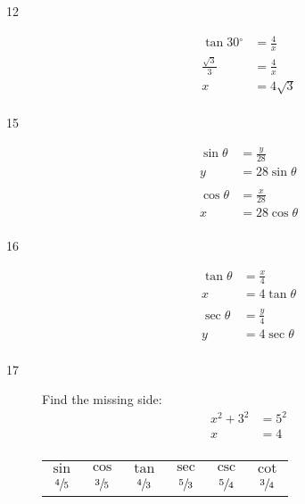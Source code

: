 \documentclass{exam}
\newcommand{\dg}{\ensuremath{^\circ}}
\begin{document}
\begin{description}
      \item[12]
        \begin{align*}
          \tan 30 \dg    & = \frac{4}{x} \\
          \frac{\sqrt{3}}{3} & = \frac{4}{x}  \\
          x                  & = \boxed{ 4 \sqrt{3} } \\
        \end{align*}

      \item[15]
        \begin{align*}
          \sin \theta & = \frac{y}{28} \\
          y           & = \boxed{ 28 \sin \theta } \\
          \\
          \cos \theta & = \frac{x}{28} \\
          x           & = \boxed{ 28 \cos \theta } \\
        \end{align*}

      \item[16]
        \begin{align*}
          \tan \theta & = \frac{x}{4} \\
          x           & = \boxed{ 4 \tan \theta } \\
          \\
          \sec \theta & = \frac{y}{4} \\
          y           & = \boxed{ 4 \sec \theta } \\
        \end{align*}

      \item[17] 
        Find the missing side:
        \begin{align*}
          x^2 + 3^2 & = 5^2 \\
          x         & = 4 \\
        \end{align*}

        \begin{tabular}[H]{cccccc}
          \toprule
          $\sin$          & $\cos$           & $\tan$          & $\sec$           & $\csc$          & $\cot$ \\
          $\sfrac{4}{5}$ & $\sfrac{3}{5}$ & $\sfrac{4}{3}$ & $\sfrac{5}{3}$ & $\sfrac{5}{4}$ & $\sfrac{3}{4}$ \\
          \bottomrule
        \end{tabular}


\end{description}
\end{document}
